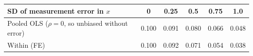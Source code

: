 \begin{tabular}{lccccc}\toprule
SD of measurement error in $x$ & 0 & 0.25 & 0.5 & 0.75 & 1.0 \\ \midrule
Pooled OLS ($\rho=0$, so unbiased without error) & 0.100 & 0.091 & 0.080 & 0.066 & 0.048 \\
Within (FE) & 0.100 & 0.092 & 0.071 & 0.054 & 0.038 \\
\bottomrule\end{tabular}
